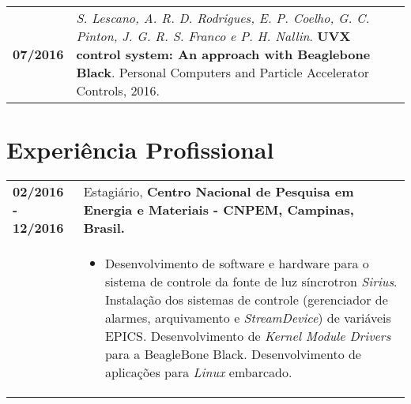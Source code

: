 \documentclass[10pt, a4paper]{article}
\begin{document}
\begin{tabular}{p{} p{}}

\textbf{07/2016}  & \textit{S. Lescano, A. R. D. Rodrigues, E. P.
Coelho, G. C. Pinton, J. G. R. S. Franco e P. H. Nallin}. \textbf{UVX
control system: An approach with Beaglebone Black}. Personal Computers and
Particle Accelerator Controls, 2016.
\\

\end{tabular}

\section{Experiência Profissional}

\begin{tabular}{p{} p{}}


%

\textbf{02/2016 - 12/2016}  & Estagiário, \textbf{Centro Nacional de Pesquisa em
Energia e Materiais - CNPEM, Campinas, Brasil.}
\\
& \vspace{-12pt}
\begin{itemize}
  \item Desenvolvimento de software e hardware para o sistema de controle da
  fonte de luz síncrotron \textit{Sirius}. Instalação dos sistemas de
  controle (gerenciador de alarmes, arquivamento e \textit{StreamDevice}) de variáveis EPICS. Desenvolvimento de
  \textit{Kernel Module Drivers} para a BeagleBone Black. Desenvolvimento
  de aplicações para \textit{Linux} embarcado.
  
\end{itemize}\\



\end{tabular}
\end{document}
